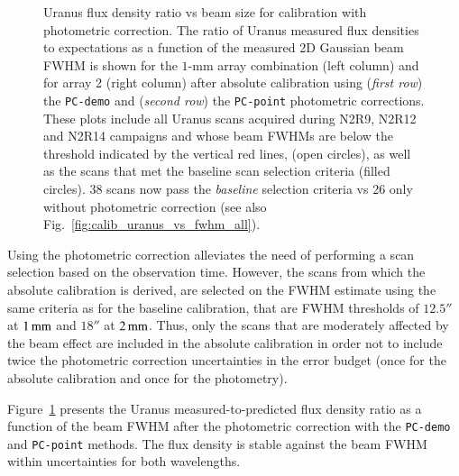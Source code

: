 \documentclass[traditionalabstract]{aa}
\begin{document}
\begin{appendix}
\begin{figure}[!htbp]
\begin{center}
    \vspace{-0.5cm}
    \caption[Uranus flux density stability against FWHM]{
      \small{Uranus flux density ratio vs beam size for calibration
  with photometric correction. The ratio of 
      Uranus measured flux densities to expectations as a function of the
      measured 2D Gaussian beam FWHM is shown for the $1$-mm array
      combination (left column) and for array 2 (right column) after absolute
      calibration using (\emph{first row}) the {\tt PC-demo} and (\emph{second
        row}) the {\tt PC-point} photometric corrections. These plots
      include all Uranus scans acquired during N2R9, N2R12 and N2R14
      campaigns and whose beam FWHMs are below the threshold indicated
      by the vertical red lines, (open circles), as
      well as the scans that met the baseline scan selection criteria (filled
      circles). 38 scans now pass the \emph{baseline} selection criteria vs 26
      only without photometric correction (see also Fig.~\ref{fig:calib_uranus_vs_fwhm_all}).}}
\label{fig:calib_uranus_vs_fwhm_photocorr}
\end{center}
\end{figure}

Using the photometric correction alleviates the need of
performing a scan selection based on the observation time. However,
the scans from which the absolute calibration is derived, are selected
on the FWHM estimate using the same criteria as for the baseline
calibration, that are FWHM thresholds of $12.5''$ at $1\, \rm{mm}$ and $18''$ at
$2\, \rm{mm}$. Thus, only the scans that are moderately affected by the beam
effect are included in the absolute calibration in order not to
include twice the photometric correction uncertainties in the error
budget (once for the absolute calibration and once for the photometry).

Figure~\ref{fig:calib_uranus_vs_fwhm_photocorr} presents the Uranus
measured-to-predicted flux density ratio as a function of the beam FWHM
after the photometric correction with the {\tt PC-demo} and
{\tt PC-point} methods. The flux
density is stable against the beam FWHM within uncertainties for both
wavelengths.


\end{appendix}
\end{document}
